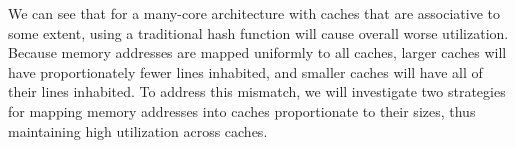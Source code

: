 We can see that for a many-core architecture with caches that are associative to
some extent, using a traditional hash function will cause overall worse
utilization.  Because memory addresses are mapped uniformly to all caches,
larger caches will have proportionately fewer lines inhabited, and smaller
caches will have all of their lines inhabited.  To address this mismatch, we
will investigate two strategies for mapping memory addresses into caches
proportionate to their sizes, thus maintaining high utilization across caches.

